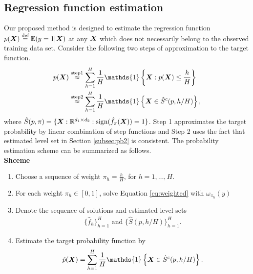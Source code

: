 \documentclass[12pt]{article}
\begin{document}
\subsection{Regression function estimation}
\label{subsec:pb3}
Our proposed method is designed to estimate  the regression function $p(\bm X)\stackrel{\text{def}}{=}\mathbb{E}(y = 1|\bm X)$ at any $\bm X$ which does not necessarily belong to the observed training data set. Consider the following two steps of approximation to the target function.
\begin{align}
\label{eq:approx}
p(\mX) &\stackrel{\text{step1}}{\approx} \sum_{h=1}^H\frac{1}{H}\mathds{1}\left\{\mX: p(\mX)\leq\frac{h}{H}\right\}\\&\stackrel{\text{step2}}{\approx} \sum_{h=1}^H\frac{1}{H}\mathds{1}\left\{\mX\in\hat S^c(p,h/H)\right\},
\end{align}
where $\hat S(p,\pi) = \{\bm X:\mathbb{R}^{d_1\times d_2} : \text{sign}(\hat f_\pi(\bm X)) = 1\}$.
Step 1 approximates the target probability by linear combination of step functions and Step 2 uses the fact that estimated level set in Section \ref{subsec:pb2} is consistent.
The probability estimation scheme can be summarized as follows.\\
{\bf Shceme}\vspace{-.4cm}
\begin{enumerate}[label={S.\arabic*}]
\item Choose a sequence of weight $\pi_h = \frac{h}{H}$, for $h = 1,\ldots, H$.
\item For each weight $\pi_h\in[0,1]$, solve Equation \eqref{eq:weighted} with $\omega_{\pi_h}(y)$
\item Denote the sequence of solutions and estimated level sets
\begin{align}
\{\hat f_h\}_{h=1}^H \text{ and } \{\hat S(p,h/H)\}_{h=1}^H.
\end{align}
\item Estimate the target probability function by 
\begin{align}
\hat p(\mX) = \sum_{h=1}^H\frac{1}{H}\mathds{1}\left\{\mX\in\hat S^c(p,h/H)\right\}.
\end{align}
\end{enumerate}
\end{document}
